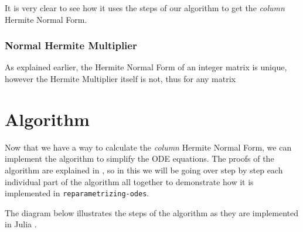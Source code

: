 \documentclass[oneside, a4paper, onecolumn, 11pt]{article}
\begin{document}
It is very clear to see how it uses the steps of our algorithm to get the \textit{column} Hermite Normal Form.

\subsubsection{Normal Hermite Multiplier}

As explained earlier, the Hermite Normal Form of an integer matrix is unique, however the Hermite Multiplier itself is not, thus for any matrix


\section{Algorithm}

Now that we have a way to calculate the \textit{column} Hermite Normal Form, we can implement the algorithm to simplify the ODE equations. The proofs of the algorithm are explained in \cite{Hubert2013}, so in this we will be going over step by step each individual part of the algorithm all together to demonstrate how it is implemented in \texttt{reparametrizing-odes}.

The diagram below illustrates the steps of the algorithm as they are implemented in Julia \cite{bezanson2017julia}.

\newpage

\end{document}

